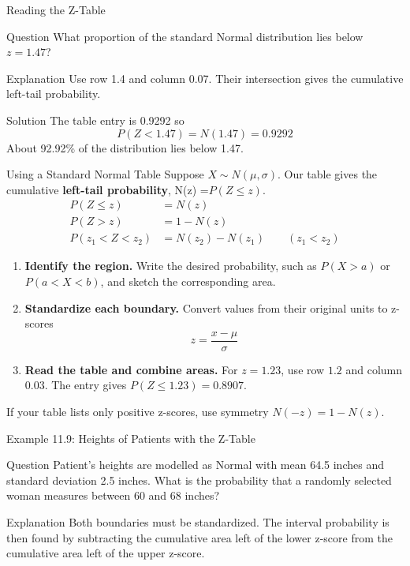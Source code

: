 \documentclass[aspectratio=169]{beamer}
\begin{document}
\begin{frame}{Reading the Z-Table}
\begin{block}{Question}
What proportion of the standard Normal distribution lies below $z=1.47$?
\end{block}

\begin{block}{Explanation}
Use row 1.4 and column 0.07. Their intersection gives the cumulative left-tail probability.
\end{block}

\begin{block}{Solution}
The table entry is 0.9292 so
$$P(Z<1.47) = N(1.47) = 0.9292$$
About 92.92\% of the distribution lies below 1.47.
\end{block}
\end{frame}

\begin{frame}{Using a Standard Normal Table}
\small
Suppose $X\sim N(\mu,\sigma)$. Our table gives the cumulative \textbf{left-tail probability}, N(z) =$P(Z\le z)$.
$$
\begin{aligned}
P(Z\le z)       &=N(z)\\
P(Z>z)         &=1-N(z)\\
P(z_1<Z<z_2)   &=N(z_2)-N(z_1)
\qquad(z_1<z_2)
\end{aligned}
$$
\begin{enumerate}
	\item \textbf{Identify the region.} Write the desired probability, such as $P(X>a)$ or $P(a<X<b)$, and sketch the corresponding area.
	\item \textbf{Standardize each boundary.} Convert values from their original units to z-scores
	$$z=\frac{x-\mu}{\sigma}$$
	\item \textbf{Read the table and combine areas.} For $z=1.23$, use row $1.2$ and column $0.03$. The entry gives $P(Z\le1.23)=0.8907$.
\end{enumerate}

If your table lists only positive z-scores, use symmetry $N(-z)=1-N(z)$.
\end{frame}

\begin{frame}{Example 11.9: Heights of Patients with the Z-Table}
\begin{block}{Question}
Patient's heights are modelled as Normal with mean 64.5 inches and standard deviation 2.5 inches. What is the probability that a randomly selected woman measures between 60 and 68 inches?
\end{block}

\begin{block}{Explanation}
Both boundaries must be standardized. The interval probability is then found by subtracting the cumulative area left of the lower z-score from the cumulative area left of the upper z-score.
\end{block}
\end{frame}
\end{document}
